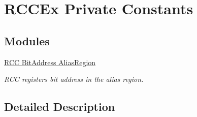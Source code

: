 \hypertarget{group___r_c_c_ex___private___constants}{}\section{R\+C\+C\+Ex Private Constants}
\label{group___r_c_c_ex___private___constants}
\subsection*{Modules}
\begin{DoxyCompactItemize}
\item 
\hyperlink{group___r_c_c_ex___bit_address___alias_region}{R\+C\+C Bit\+Address Alias\+Region}
\begin{DoxyCompactList}\small\item\em R\+CC registers bit address in the alias region. \end{DoxyCompactList}\end{DoxyCompactItemize}


\subsection{Detailed Description}
